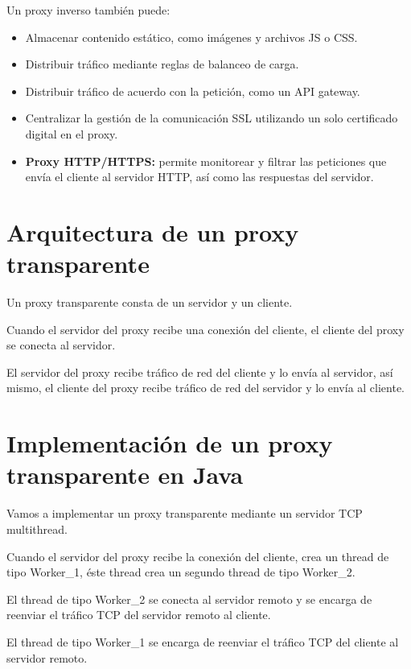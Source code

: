 \documentclass[11pt,a4paper,oneside]{book}
\begin{document}
Un proxy inverso también puede:

\begin{itemize}

\item Almacenar contenido estático, como imágenes y archivos JS o CSS.

\item Distribuir tráfico mediante reglas de balanceo de carga.

\item Distribuir tráfico de acuerdo con la petición, como un API gateway.

\item Centralizar la gestión de la comunicación SSL utilizando un solo certificado digital en el proxy.

\item \textbf{Proxy HTTP/HTTPS:} permite monitorear y filtrar las peticiones que envía el cliente al servidor HTTP, así como las respuestas del servidor.

\end{itemize}

\section{Arquitectura de un proxy transparente}

Un proxy transparente consta de un servidor y un cliente.

Cuando el servidor del proxy recibe una conexión del cliente, el cliente del proxy se conecta al servidor.

El servidor del proxy recibe tráfico de red del cliente y lo envía al servidor, así mismo, el cliente del proxy recibe tráfico de red del servidor y lo envía al cliente.

\section{Implementación de un proxy transparente en Java}

Vamos a implementar un proxy transparente mediante un servidor TCP multithread.

Cuando el servidor del proxy recibe la conexión del cliente, crea un thread de tipo Worker\_1, éste thread crea un segundo thread de tipo Worker\_2.

El thread de tipo Worker\_2 se conecta al servidor remoto y se encarga de reenviar el tráfico TCP del servidor remoto al cliente.

El thread de tipo Worker\_1 se encarga de reenviar el tráfico TCP del cliente al servidor remoto.
\end{document}
